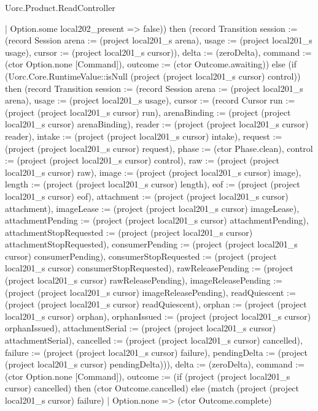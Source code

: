 \begin{lexlean}{Uorc.Product.ReadController}
\begin{semanticmodule}
{          | Option.some local202_present => false)) then (record Transition {session := (record Session {arena := (project local201_s arena), usage := (project local201_s usage), cursor := (project local201_s cursor)}), delta := (zeroDelta), command := (ctor Option.none [Command]), outcome := (ctor Outcome.awaiting)}) else (if (Uorc.Core.RuntimeValue::isNull (project (project local201_s cursor) control)) then (record Transition {session := (record Session {arena := (project local201_s arena), usage := (project local201_s usage), cursor := (record Cursor {run := (project (project local201_s cursor) run), arenaBinding := (project (project local201_s cursor) arenaBinding), reader := (project (project local201_s cursor) reader), intake := (project (project local201_s cursor) intake), request := (project (project local201_s cursor) request), phase := (ctor Phase.clean), control := (project (project local201_s cursor) control), raw := (project (project local201_s cursor) raw), image := (project (project local201_s cursor) image), length := (project (project local201_s cursor) length), eof := (project (project local201_s cursor) eof), attachment := (project (project local201_s cursor) attachment), imageLease := (project (project local201_s cursor) imageLease), attachmentPending := (project (project local201_s cursor) attachmentPending), attachmentStopRequested := (project (project local201_s cursor) attachmentStopRequested), consumerPending := (project (project local201_s cursor) consumerPending), consumerStopRequested := (project (project local201_s cursor) consumerStopRequested), rawReleasePending := (project (project local201_s cursor) rawReleasePending), imageReleasePending := (project (project local201_s cursor) imageReleasePending), readQuiescent := (project (project local201_s cursor) readQuiescent), orphan := (project (project local201_s cursor) orphan), orphanIssued := (project (project local201_s cursor) orphanIssued), attachmentSerial := (project (project local201_s cursor) attachmentSerial), cancelled := (project (project local201_s cursor) cancelled), failure := (project (project local201_s cursor) failure), pendingDelta := (project (project local201_s cursor) pendingDelta)})}), delta := (zeroDelta), command := (ctor Option.none [Command]), outcome := (if (project (project local201_s cursor) cancelled) then (ctor Outcome.cancelled) else (match (project (project local201_s cursor) failure)
          | Option.none => (ctor Outcome.complete)
}}
\end{semanticmodule}
\end{lexlean}
